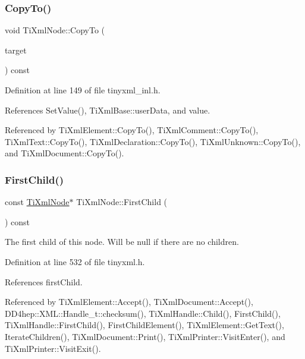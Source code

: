 \subsubsection{\texorpdfstring{Copy\+To()}{CopyTo()}}
{\footnotesize\ttfamily void Ti\+Xml\+Node\+::\+Copy\+To (\begin{DoxyParamCaption}\item[{\hyperlink{class_ti_xml_node}{Ti\+Xml\+Node} $\ast$}]{target }\end{DoxyParamCaption}) const\hspace{0.3cm}{\ttfamily [protected]}}



Definition at line 149 of file tinyxml\+\_\+inl.\+h.



References Set\+Value(), Ti\+Xml\+Base\+::user\+Data, and value.



Referenced by Ti\+Xml\+Element\+::\+Copy\+To(), Ti\+Xml\+Comment\+::\+Copy\+To(), Ti\+Xml\+Text\+::\+Copy\+To(), Ti\+Xml\+Declaration\+::\+Copy\+To(), Ti\+Xml\+Unknown\+::\+Copy\+To(), and Ti\+Xml\+Document\+::\+Copy\+To().

\hypertarget{class_ti_xml_node_aa66bceae19707c90c1db12d7c98894a4}{}\label{class_ti_xml_node_aa66bceae19707c90c1db12d7c98894a4} 
\subsubsection{\texorpdfstring{First\+Child()}{FirstChild()}\hspace{0.1cm}{\footnotesize\ttfamily [1/6]}}
{\footnotesize\ttfamily const \hyperlink{class_ti_xml_node}{Ti\+Xml\+Node}$\ast$ Ti\+Xml\+Node\+::\+First\+Child (\begin{DoxyParamCaption}{ }\end{DoxyParamCaption}) const\hspace{0.3cm}{\ttfamily [inline]}}



The first child of this node. Will be null if there are no children. 



Definition at line 532 of file tinyxml.\+h.



References first\+Child.



Referenced by Ti\+Xml\+Element\+::\+Accept(), Ti\+Xml\+Document\+::\+Accept(), D\+D4hep\+::\+X\+M\+L\+::\+Handle\+\_\+t\+::checksum(), Ti\+Xml\+Handle\+::\+Child(), First\+Child(), Ti\+Xml\+Handle\+::\+First\+Child(), First\+Child\+Element(), Ti\+Xml\+Element\+::\+Get\+Text(), Iterate\+Children(), Ti\+Xml\+Document\+::\+Print(), Ti\+Xml\+Printer\+::\+Visit\+Enter(), and Ti\+Xml\+Printer\+::\+Visit\+Exit().

